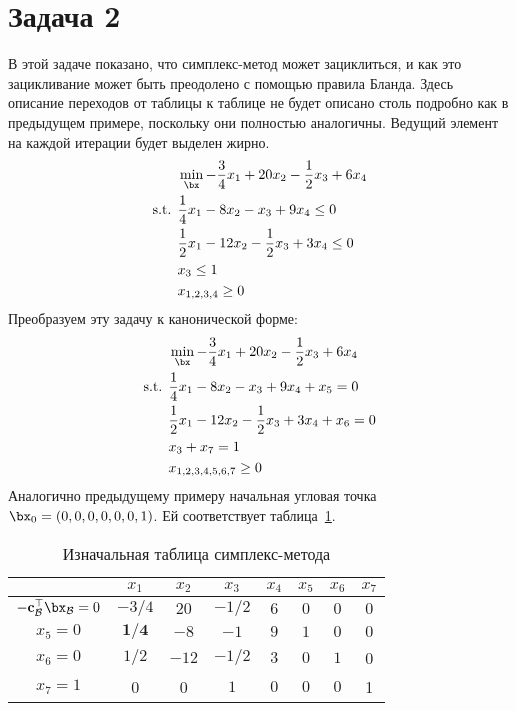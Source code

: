 \documentclass[12pt]{article}
\begin{document}
\section{Задача 2}
В этой задаче показано, что симплекс-метод может зациклиться, и как это зацикливание может быть преодолено с помощью правила Бланда. 
Здесь описание переходов от таблицы к таблице не будет описано столь подробно как в предыдущем примере, поскольку они полностью аналогичны. 
Ведущий элемент на каждой итерации будет выделен жирно.
\begin{equation*}
\begin{split}
& \min_{\bx} -\frac{3}{4}x_1 + 20x_2 - \frac{1}{2}x_3 + 6x_4\\
\text{s.t. } & \frac{1}{4}x_1 - 8x_2 - x_3 + 9x_4 \leq 0\\
& \frac{1}{2}x_1 - 12x_2 - \frac{1}{2}x_3 + 3x_4 \leq 0\\
& x_3 \leq 1\\
& x_{1,2,3,4} \geq 0
\end{split}
\end{equation*}
Преобразуем эту задачу к канонической форме:
\begin{equation*}
\begin{split}
& \min_{\bx} -\frac{3}{4}x_1 + 20x_2 - \frac{1}{2}x_3 + 6x_4\\
\text{s.t. } & \frac{1}{4}x_1 - 8x_2 - x_3 + 9x_4 + x_5 = 0\\
& \frac{1}{2}x_1 - 12x_2 - \frac{1}{2}x_3 + 3x_4 + x_6 = 0\\
& x_3 + x_7 = 1\\
& x_{1,2,3,4,5,6,7} \geq 0
\end{split}
\end{equation*}
Аналогично предыдущему примеру начальная угловая точка $\bx_0 = (0,0,0,0, 0,0,1)$.
Ей соответствует таблица~\ref{tab::simplex_20}.

\begin{table}[!ht]
\centering
\caption{Изначальная таблица симплекс-метода}
\begin{tabular}{|c|ccccccc|}
\hline
& $x_1$ & $x_2$ & $x_3$ & $x_4$ & $x_5$ & $x_6$ & $x_7$\\
\hline
$-\mathbf{c}_{\mathcal{B}}^{\top}\bx_{\mathcal{B}} = 0$ & $-3/4$ & $20$ & $-1/2$ & $6$ & $0$ & $0$ & $0$ \\
\hline
$x_5 = 0$ & $\mathbf{1/4}$ & $-8$ & $-1$ & $9$ & $1$ & $0$ & $0$ \\
$x_6 = 0$ & $1/2$ & $-12$ & $-1/2$ & $3$ & $0$ & $1$ & 0 \\
$x_7 = 1$ & 0 & 0 & $1$ & $0$ & $0$ & $0$ & 1 \\
\hline
\end{tabular}
\label{tab::simplex_20}
\end{table}
\end{document}
